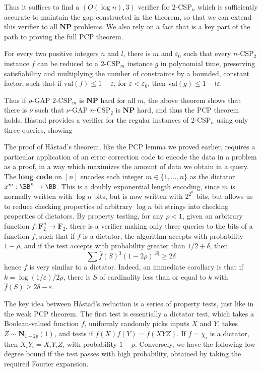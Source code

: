 Thus it suffices to find a $(O(\log n), 3)$ verifier for $2\text{-CSP}_n$ which is sufficiently accurate to maintain the gap constructed in the theorem, so that we can extend this verifier to all $\mathbf{NP}$ problems. We also rely on a fact that is a key part of the path to proving the full PCP theorem.

\begin{theorem}
    For every two positive integers $n$ and $l$, there is $m$ and $\varepsilon_0$ such that every $n\text{-CSP}_2$ instance $f$ can be reduced to a $2\text{-CSP}_m$ instance $g$ in polynomial time, preserving satisfiability and multiplying the number of constraints by a bounded, constant factor, such that if $\text{val}(f) \leq 1 - \varepsilon$, for $\varepsilon < \varepsilon_0$, then $\text{val}(g) \leq 1 - l\varepsilon$.
\end{theorem}

Thus if $\rho$-GAP $2\text{-CSP}_m$ is $\mathbf{NP}$ hard for all $m$, the above theorem shows that there is $\nu$ such that $\nu$-GAP $n\text{-CSP}_2$ is $\mathbf{NP}$ hard, and thus the PCP theorem holds. Håstad provides a verifier for the regular instances of $2\text{-CSP}_n$ using only three queries, showing 

The proof of Håstad's theorem, like the PCP lemma we proved earlier, requires a particular application of an error correction code to encode the data in a problem as a proof, in a way which maximizes the amount of data we obtain in a query. The {\bf long code} on $[n]$ encodes each integer $m \in \{ 1, \dots, n \}$ as the dictator $x^m: \BB^n \to \BB$. This is a doubly exponential length encoding, since $m$ is normally written with $\log n$ bits, but is now written with $2^{2^n}$ bits, but allows us to reduce checking properties of arbitrary $\log n$ bit strings into checking properties of dictators. By property testing, for any $\rho < 1$, given an arbitrary function $f: \mathbf{F}_2^n \to \mathbf{F}_2$, there is a verifier making only three queries to the bits of a function $f$, such that if $f$ is a dictator, the algorithm accepts with probability $1 - \rho$, and if the test accepts with probability greater than $1/2 + \delta$, then
%
\[ \sum \widehat{f}(S)^3 (1 - 2 \rho)^{|S|} \geq 2 \delta \]
%
hence $f$ is very similar to a dictator. Indeed, an immediate corollary is that if $k = \log(1/\varepsilon) /2\rho$, there is $S$ of cardinality less than or equal to $k$ with $\widehat{f}(S) \geq 2\delta - \varepsilon$.

The key idea between Håstad's reduction is a series of property tests, just like in the weak PCP theorem. The first test is essentially a dictator test, which takes a Boolean-valued function $f$, uniformly randomly picks inputs $X$ and $Y$, takes $Z \sim \mathbf{N}_{1-2p}(1)$, and tests if $f(X)f(Y) = f(XYZ)$. If $f = \chi_i$ is a dictator, then $X_iY_i = X_iY_iZ_i$ with probability $1 - \rho$. Conversely, we have the following low degree bound if the test passes with high probability, obtained by taking the required Fourier expansion.

